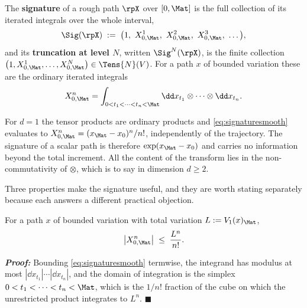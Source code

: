 \begin{definition}[Signature]\label{def:signature}
The \textbf{signature} of a rough path $\rpX$ over $[0,\Mat]$ is the full collection of its iterated
integrals over the whole interval,
\begin{equation}\label{eq:signature}
\Sig(\rpX) \;:=\; \bigl(1,\ X^1_{0,\Mat},\ X^2_{0,\Mat},\ X^3_{0,\Mat},\ \dots\bigr),
\end{equation}
and its \textbf{truncation at level $N$}, written $\Sig^N(\rpX)$, is the finite collection
$\bigl(1, X^1_{0,\Mat},\dots,X^N_{0,\Mat}\bigr) \in \Tens{N}(V)$. For a path $x$ of bounded
variation these are the ordinary iterated integrals
\begin{equation}\label{eq:signaturesmooth}
X^n_{0,\Mat} = \int_{0<t_1<\cdots<t_n<\Mat} \dd x_{t_1}\otimes\cdots\otimes \dd x_{t_n}.
\end{equation}
\end{definition}

\begin{example}\label{ex:signatureonedim}
For $d=1$ the tensor products are ordinary products and \eqref{eq:signaturesmooth} evaluates to
$X^n_{0,\Mat} = (x_\Mat - x_0)^n/n!$, independently of the trajectory. The signature of a scalar
path is therefore $\exp(x_\Mat - x_0)$ and carries no information beyond the total increment. All
the content of the transform lies in the non-commutativity of $\otimes$, which is to say in
dimension $d\geq2$.
\end{example}

Three properties make the signature useful, and they are worth stating separately because each
answers a different practical objection.

\begin{proposition}\label{prop:factorialdecay}
For a path $x$ of bounded variation with total variation $L := V_1(x)_\Mat$,
\begin{equation}\label{eq:factorialdecay}
\bigl| X^n_{0,\Mat} \bigr| \;\leq\; \frac{L^n}{n!} .
\end{equation}
\end{proposition}

\textbf{\textit{Proof:}} Bounding \eqref{eq:signaturesmooth} termwise, the integrand has modulus at
most $|\dd x_{t_1}|\cdots|\dd x_{t_n}|$, and the domain of integration is the simplex
$0<t_1<\cdots<t_n<\Mat$, which is the $1/n!$ fraction of the cube on which the unrestricted product
integrates to $L^n$. \hfill $\blacksquare$

